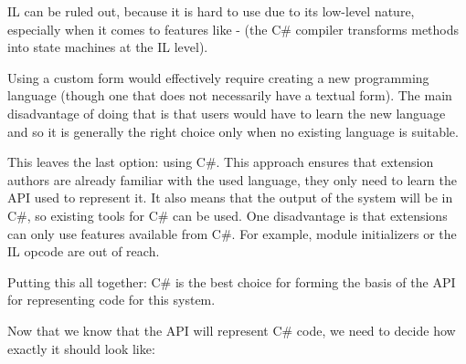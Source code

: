 \ac{IL} can be ruled out, because it is hard to use due to its low-level nature, especially when it comes to features like - (the C\# compiler transforms  methods into state machines at the \ac{IL} level).

Using a custom form would effectively require creating a new programming language (though one that does not necessarily have a textual form). The main disadvantage of doing that is that users would have to learn the new language and so it is generally the right choice only when no existing language is suitable.

This leaves the last option: using C\#. This approach ensures that extension authors are already familiar with the used language, they only need to learn the \ac{API} used to represent it. It also means that the output of the system will be in C\#, so existing tools for C\# can be used. One disadvantage is that extensions can only use features available from C\#. For example, module initializers or the  \ac{IL} opcode are out of reach.

Putting this all together: C\# is the best choice for forming the basis of the \ac{API} for representing code for this system.

\medskip

Now that we know that the \ac{API} will represent C\# code, we need to decide how exactly it should look like:

